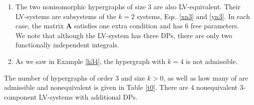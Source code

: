 \documentclass{article}
\def\A{\mathbf{A}}
\begin{document}
\begin{enumerate}[1.]
\begin{subequations}
\begin{equation}
\A=\left(\begin{array}{ccc}
\frac{a_{1} a_{2} a_{3}-a_{1} b_{2} c_{2}-a_{2} b_{2} c_{1}-a_{3} b_{1} c_{1}+b_{1} b_{2} c_{1}+b_{2} c_{1} c_{2}}{\left(a_{3}-b_{2}\right) \left(a_{2}-b_{1}\right)} & \frac{a_{2} b_{2}+a_{3} b_{1}-b_{1} b_{2}-b_{2} c_{2}}{\left(a_{3}-b_{2}\right) \left(a_{2}-b_{1}\right)} & \frac{b_{2}}{a_{3}-b_{2}} 
\\[2mm]
 \frac{2 a_{1} a_{2} a_{3}-a_{1} a_{2} b_{2}-a_{1} a_{3} b_{1}+a_{1} b_{1} b_{2}-a_{1} b_{2} c_{2}-a_{2} a_{3} c_{1}+b_{2} c_{1} c_{2}}{\left(a_{3}-b_{2}\right) \left(a_{2}-b_{1}\right)} & \frac{a_{2} a_{3}-b_{2} c_{2}}{\left(a_{3}-b_{2}\right) \left(a_{2}-b_{1}\right)} & \frac{b_{2}}{a_{3}-b_{2}} 
\\[2mm]
 \frac{2 a_{1} a_{2} a_{3}-a_{1} a_{2} b_{2}-a_{1} a_{3} c_{2}-a_{2} a_{3} c_{1}-a_{3} b_{1} c_{1}+a_{3} c_{1} c_{2}+b_{1} b_{2} c_{1}}{\left(a_{3}-b_{2}\right) \left(a_{2}-b_{1}\right)} & \frac{2 a_{2} a_{3}-a_{2} b_{2}-a_{3} c_{2}}{\left(a_{3}-b_{2}\right) \left(a_{2}-b_{1}\right)} & \frac{a_{3}}{a_{3}-b_{2}} 
\end{array}\right),
\end{equation}
\end{subequations}
which satisfies the condition $C_{1,2,3}=0$.
The LV system \eqref{yn3} admits the DPs
\[
 (a_{1}- c_{1})y_{1}+y_{2},\quad \left(a_{1}-c_{1}\right) \left(a_2-c_{2}\right)y_{1} + \left(a_{2}-c_{2}\right)y_{2} +\left(a_{2}-b_{1}\right) y_{3},
 \]
and corresponds to the other hypergraph of size 2 in Fig. \ref{nih3}. This hypergraph is therefore LV-equivalent to the tree on 3 vertices.
\item The two nonisomorphic hypergraphs of size $3$ are also LV-equivalent. Their LV-systems are subsystems of the $k=2$ systems, Eqs. \eqref{xn3} and \eqref{yn3}. In each case, the matrix $\A$ satisfies one extra condition and has 6 free parameters. We note that although the LV-system has three DPs, there are only two functionally independent integrals.
\item As we saw in Example \ref{h34}, the hypergraph with $k=4$ is not admissible.
\end{enumerate}
The number of hypergraphs of order 3 and size $k>0$, as well as how many of are admissible and nonequivalent is given in Table \ref{t0}. There are 4 nonequivalent 3-component LV-systems with additional DPs.
\end{document}
